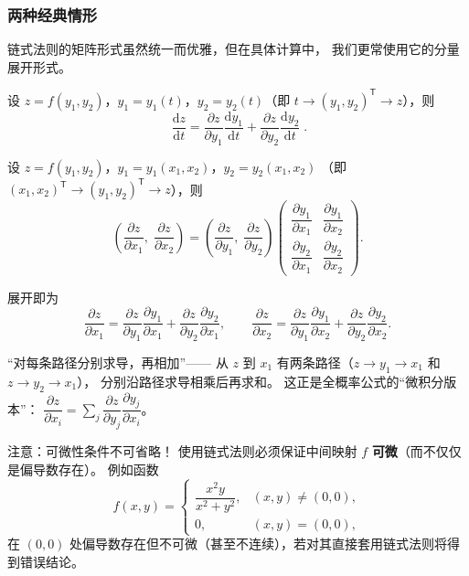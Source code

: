 \documentclass[lang=cn,11pt]{elegantbook}
\begin{document}
\subsubsection*{两种经典情形}

链式法则的矩阵形式虽然统一而优雅，但在具体计算中，
我们更常使用它的分量展开形式。

\begin{property} \label{prop:chain-one-var}
设 $z=f(y_1,y_2)$，$y_1=y_1(t)$，$y_2=y_2(t)$（即 $t\to(y_1,y_2)^{\mathsf T}\to z$），则
\[
\boxed{\;\frac{\mathrm{d}z}{\mathrm{d}t}
=\frac{\partial z}{\partial y_1}\frac{\mathrm{d}y_1}{\mathrm{d}t}
+\frac{\partial z}{\partial y_2}\frac{\mathrm{d}y_2}{\mathrm{d}t}\;}.
\]
\end{property}

\begin{property} \label{prop:chain-two-var}
设 $z=f(y_1,y_2)$，$y_1=y_1(x_1,x_2)$，$y_2=y_2(x_1,x_2)$
（即 $(x_1,x_2)^{\mathsf T}\to(y_1,y_2)^{\mathsf T}\to z$），则
\[
\boxed{
\left(\frac{\partial z}{\partial x_1},\;\frac{\partial z}{\partial x_2}\right)
=\left(\frac{\partial z}{\partial y_1},\;\frac{\partial z}{\partial y_2}\right)
\begin{pmatrix}
\dfrac{\partial y_1}{\partial x_1} & \dfrac{\partial y_1}{\partial x_2}\\[8pt]
\dfrac{\partial y_2}{\partial x_1} & \dfrac{\partial y_2}{\partial x_2}
\end{pmatrix}
}.
\]

展开即为
\[
\frac{\partial z}{\partial x_1}
=\frac{\partial z}{\partial y_1}\frac{\partial y_1}{\partial x_1}
+\frac{\partial z}{\partial y_2}\frac{\partial y_2}{\partial x_1},
\qquad
\frac{\partial z}{\partial x_2}
=\frac{\partial z}{\partial y_1}\frac{\partial y_1}{\partial x_2}
+\frac{\partial z}{\partial y_2}\frac{\partial y_2}{\partial x_2}.
\]
\end{property}

\begin{note}
“对每条路径分别求导，再相加”——
从 $z$ 到 $x_1$ 有两条路径（$z\to y_1\to x_1$ 和 $z\to y_2\to x_1$），
分别沿路径求导相乘后再求和。
这正是全概率公式的“微积分版本”：
$\dfrac{\partial z}{\partial x_i}=\sum\limits_{j}\dfrac{\partial z}{\partial y_j}\dfrac{\partial y_j}{\partial x_i}$。
\end{note}

\begin{note}{注意：可微性条件不可省略！}
使用链式法则必须保证中间映射 $f$ \textbf{可微}（而不仅仅是偏导数存在）。
例如函数
\[
f(x,y)=
\begin{cases}
\dfrac{x^2y}{x^2+y^2},&(x,y)\neq(0,0),\\[10pt]
0,&(x,y)=(0,0),
\end{cases}
\]
在 $(0,0)$ 处偏导数存在但不可微（甚至不连续），若对其直接套用链式法则将得到错误结论。
\end{note}
\end{document}
